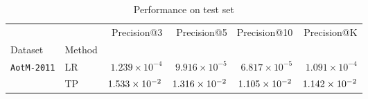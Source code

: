 \begin{table}[!h]
\centering
\caption{Performance on test set}
\label{tab:perf_music}
\begin{tabular}{llrrrr}
\toprule
        &        & Precision@3 & Precision@5 & Precision@10 & Precision@K  \\
Dataset & Method &             &             &              \\
\midrule
\multirow{2}{*}{\texttt{AotM-2011}} 
& LR & $1.239 \times 10^{-4}$            &    $9.916 \times 10^{-5}$       & $6.817 \times 10^{-5}$     &    $1.091 \times 10^{-4}$ \\
& TP & $\firstBest{1.533\times 10^{-2}}$ & $\firstBest{1.316\times 10^{-2}}$ & $\firstBest{1.105\times 10^{-2}}$ & $\firstBest{1.142 \times 10^{-2}}$ \\
\bottomrule
\end{tabular}

\end{table}
